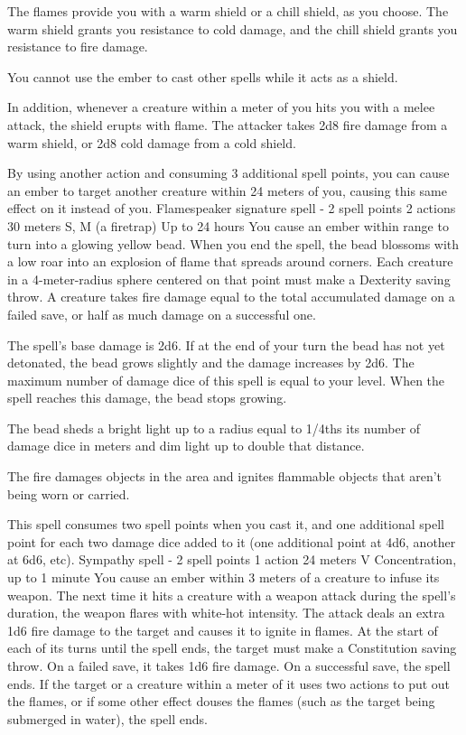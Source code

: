        The flames provide you with a warm shield or a chill shield, as you choose.
        The warm shield grants you resistance to cold damage, and the chill shield grants you resistance to fire damage.

        You cannot use the ember to cast other spells while it acts as a shield.

        In addition, whenever a creature within a meter of you hits you with a melee attack, the shield erupts with flame.
        The attacker takes 2d8 fire damage from a warm shield, or 2d8 cold damage from a cold shield.

        By using another action and consuming 3 additional spell points, you can cause an ember to target another creature within 24 meters of you, causing this same effect on it instead of you.
        {Flamespeaker signature spell - 2 spell points}
        {2 actions}
        {30 meters}
        {S, M (a firetrap)}
        {Up to 24 hours}
        You cause an ember within range to turn into a glowing yellow bead.
        When you end the spell, the bead blossoms with a low roar into an explosion of flame that spreads around corners.
        Each creature in a 4-meter-radius sphere centered on that point must make a Dexterity saving throw.
        A creature takes fire damage equal to the total accumulated damage on a failed save, or half as much damage on a successful one.

        The spell's base damage is 2d6.
        If at the end of your turn the bead has not yet detonated, the bead grows slightly and the damage increases by 2d6.
        The maximum number of damage dice of this spell is equal to your level.
        When the spell reaches this damage, the bead stops growing.

        The bead sheds a bright light up to a radius equal to 1/4ths its number of damage dice in meters and dim light up to double that distance.

        The fire damages objects in the area and ignites flammable objects that aren't being worn or carried.

        This spell consumes two spell points when you cast it, and one additional spell point for each two damage dice added to it (one additional point at 4d6, another at 6d6, etc).
        {Sympathy spell - 2 spell points}
        {1 action}
        {24 meters}
        {V}
        {Concentration, up to 1 minute}
        You cause an ember within 3 meters of a creature to infuse its weapon.
        The next time it hits a creature with a weapon attack during the spell's duration, the weapon flares with white-hot intensity.
        The attack deals an extra 1d6 fire damage to the target and causes it to ignite in flames.
        At the start of each of its turns until the spell ends, the target must make a Constitution saving throw.
        On a failed save, it takes 1d6 fire damage.
        On a successful save, the spell ends.
        If the target or a creature within a meter of it uses two actions to put out the flames, or if some other effect douses the flames (such as the target being submerged in water), the spell ends.


